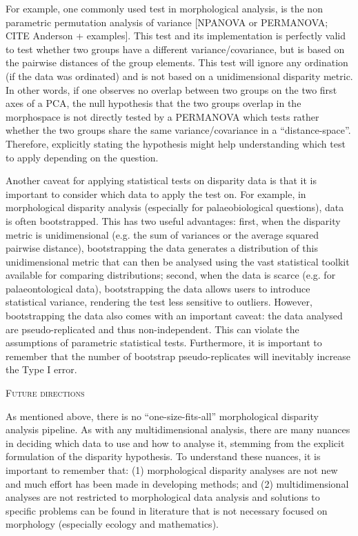 \documentclass[12pt,letterpaper]{article}
\renewcommand{\section}[1]{%
\bigskip
\begin{center}
\begin{Large}
\normalfont\scshape #1
\medskip
\end{Large}
\end{center}}
\begin{document}
For example, one commonly used test in morphological analysis, is the non parametric permutation analysis of variance [NPANOVA or PERMANOVA; CITE Anderson + examples].
This test and its implementation is perfectly valid to test whether two groups have a different variance/covariance, but is based on the pairwise distances of the group elements.
This test will ignore any ordination (if the data was ordinated) and is not based on a unidimensional disparity metric.
In other words, if one observes no overlap between two groups on the two first axes of a PCA, the null hypothesis that the two groups overlap in the morphospace is not directly tested by a PERMANOVA which tests rather whether the two groups share the same variance/covariance in a ``distance-space''.
Therefore, explicitly stating the hypothesis might help understanding which test to apply depending on the question.

Another caveat for applying statistical tests on disparity data is that it is important to consider which data to apply the test on.
For example, in morphological disparity analysis (especially for palaeobiological questions), data is often bootstrapped.
This has two useful advantages: first, when the disparity metric is unidimensional (e.g. the sum of variances or the average squared pairwise distance), bootstrapping the data generates a distribution of this unidimensional metric that can then be analysed using the vast statistical toolkit available for comparing distributions; second, when the data is scarce (e.g. for palaeontological data), bootstrapping the data allows users to introduce statistical variance, rendering the test less sensitive to outliers.
However, bootstrapping the data also comes with an important caveat: the data analysed are pseudo-replicated and thus non-independent.
This can violate the assumptions of parametric statistical tests.
Furthermore, it is important to remember that the number of bootstrap pseudo-replicates will inevitably increase the Type I error.

\section{Future directions}
As mentioned above, there is no ``one-size-fits-all'' morphological disparity analysis pipeline.
As with any multidimensional analysis, there are many nuances in deciding which data to use and how to analyse it, stemming from the explicit formulation of the disparity hypothesis.
To understand these nuances, it is important to remember that: (1) morphological disparity analyses are not new and much effort has been made in developing methods; and (2) multidimensional analyses are not restricted to morphological data analysis and solutions to specific problems can be found in literature that is not necessary focused on morphology (especially ecology and mathematics).
\end{document}
